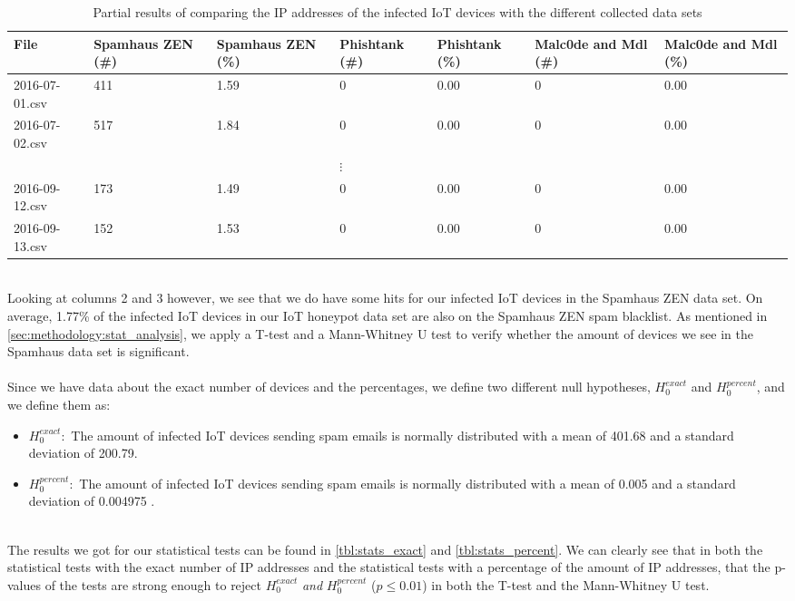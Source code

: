 \documentclass[a4paper,10pt]{article}
\begin{document}
\begin{table}[h]
 \begin{tabularx}{\linewidth}{lXXXXXX}
 \toprule
 File & Spamhaus ZEN (\#) & Spamhaus ZEN (\%) & Phishtank (\#) &  Phishtank (\%) & Malc0de and Mdl (\#) & Malc0de and Mdl (\%) \\
 \midrule
 2016-07-01.csv & 411 & 1.59 & 0 & 0.00 & 0 & 0.00 \\
 2016-07-02.csv & 517 & 1.84 & 0 & 0.00 & 0 & 0.00 \\
 &  &  & $\vdots$ &  &  &  \\
2016-09-12.csv & 173 & 1.49 & 0 & 0.00 & 0 & 0.00 \\
2016-09-13.csv & 152 & 1.53 & 0 & 0.00 & 0 & 0.00 \\
 \bottomrule
 \end{tabularx}
 \caption{Partial results of comparing the IP addresses of the infected IoT devices with the different collected data sets}
 \label{tbl:results_partial}
\end{table}
~\\
Looking at columns 2 and 3 however, we see that we do have some hits for our  infected IoT devices in the Spamhaus
ZEN data set. On average, 1.77\% of the infected IoT devices in our IoT honeypot data set are also on the Spamhaus ZEN
spam blacklist. As mentioned in \autoref{sec:methodology:stat_analysis}, we apply a T-test  and a Mann-Whitney U test
to verify whether the amount of devices we see in the Spamhaus data set is significant. 
\\\\
Since we have data about the exact number of devices and the percentages, we define two different null hypotheses, 
$H_0^{exact}$ and $H_0^{percent}$, and we define them as:
\begin{itemize}
 \item[] $H_0^{exact}:$ The amount of infected IoT devices sending spam emails is normally distributed with a mean 
 of 401.68 and  a standard deviation of 200.79.
 \item[] $H_0^{percent}:$ The amount of infected IoT devices sending spam emails is normally distributed with a mean 
 of 0.005 and  a standard deviation of 0.004975 .
\end{itemize}
~\\
The results we got for our statistical tests can be found in \autoref{tbl:stats_exact} and \autoref{tbl:stats_percent}. We 
can clearly see that in both the statistical tests with the exact number of IP addresses and the statistical tests with a 
percentage of the amount of IP addresses, that the p-values of the tests are strong enough to reject  $H_0^{exact}$ 
\textit{and} $H_0^{percent}$ ($p \leq 0.01$) in both the T-test and the Mann-Whitney U test.
\end{document}
